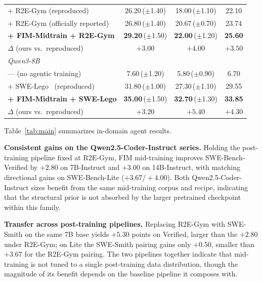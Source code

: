 \begin{table}[t]
\begin{tabular}{lccc}
\quad + R2E-Gym (reproduced)                          & 26.20\,($\pm$1.40)           & 18.00\,($\pm$1.10)           & 22.10 \\
\quad + R2E-Gym (officially reported)                 & 26.80\,($\pm$1.40)           & 20.67\,($\pm$0.70)           & 23.74 \\
\quad \textbf{+ FIM-Midtrain + R2E-Gym}               & \textbf{29.20}\,($\pm$1.50)  & \textbf{22.00}\,($\pm$1.20)  & \textbf{25.60} \\
\rowcolor{blue!8}
\quad\quad $\Delta$ (ours vs.\ reproduced)            & $+3.00$                      & $+4.00$                      & $+3.50$ \\
\midrule
\multicolumn{4}{l}{\textit{Qwen3-8B}} \\
\quad --- (no agentic training)                       & 7.60\,($\pm$1.20)            & 5.80\,($\pm$0.90)            & 6.70 \\
\quad + SWE-Lego~\citep{swelego} (reproduced)         & 31.80\,($\pm$1.00)           & 27.30\,($\pm$1.10)           & 29.55 \\
\quad \textbf{+ FIM-Midtrain + SWE-Lego}              & \textbf{35.00}\,($\pm$1.50)  & \textbf{32.70}\,($\pm$1.30)  & \textbf{33.85} \\
\rowcolor{blue!8}
\quad\quad $\Delta$ (ours vs.\ reproduced)            & $+3.20$                      & $+5.40$                      & $+4.30$ \\
\bottomrule
\end{tabular}
\end{table}

Table~\ref{tab:main} summarizes in-domain agent results.

\textbf{Consistent gains on the Qwen2.5-Coder-Instruct series.}
Holding the post-training pipeline fixed at R2E-Gym, FIM mid-training
improves SWE-Bench-Verified by $+2.80$ on 7B-Instruct and $+3.00$ on
14B-Instruct, with matching directional gains on SWE-Bench-Lite
($+3.67/+4.00$). Both Qwen2.5-Coder-Instruct sizes benefit from the same
mid-training corpus and recipe, indicating that the structural prior is
not absorbed by the larger pretrained checkpoint within this family.

\textbf{Transfer across post-training pipelines.}
Replacing R2E-Gym with SWE-Smith on the same 7B base yields $+5.30$
points on Verified, larger than the $+2.80$ under R2E-Gym; on Lite the
SWE-Smith pairing gains only $+0.50$, smaller than $+3.67$ for the
R2E-Gym pairing. The two pipelines together indicate that mid-training
is not tuned to a single post-training data distribution, though the
magnitude of its benefit depends on the baseline pipeline it composes
with.

